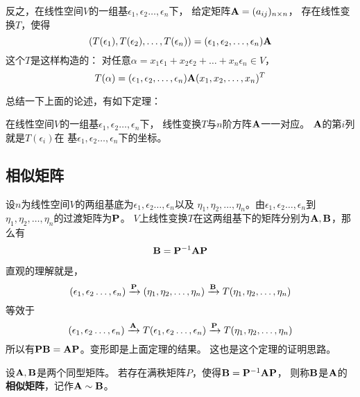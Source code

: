 反之，在线性空间$V$的一组基$\epsilon_1,\epsilon_2\dots,\epsilon_n$下，
给定矩阵$\mathbf{A}=(a_{ij})_{n\times n}$，
存在线性变换$T$，使得
\begin{displaymath}
  (T(\epsilon_1), T(\epsilon_2),\dots,T(\epsilon_n)) =
    (\epsilon_1,\epsilon_2,\dots,\epsilon_n)\mathbf{A}
\end{displaymath}
这个$T$是这样构造的：
对任意$\alpha=x_1\epsilon_1+x_2\epsilon_2+\dots+x_n\epsilon_n\in V$，
\begin{displaymath}
  T(\alpha) = (\epsilon_1,\epsilon_2,\dots,\epsilon_n)\mathbf{A}
    (x_1,x_2,\dots,x_n)^T
\end{displaymath}

总结一下上面的论述，有如下定理：
\begin{theorem}
  在线性空间$V$的一组基$\epsilon_1,\epsilon_2\dots,\epsilon_n$下，
  线性变换$T$与$n$阶方阵$\mathbf{A}$一一对应。
  $\mathbf{A}$的第$i$列就是$T(\epsilon_i)$在
  基$\epsilon_1,\epsilon_2\dots,\epsilon_n$下的坐标。
\end{theorem}

\subsection{相似矩阵}
\begin{theorem}
  设$n$为线性空间$V$的两组基底为$\epsilon_1,\epsilon_2\dots,\epsilon_n$以及
  $\eta_1,\eta_2,\dots,\eta_n$。由$\epsilon_1,\epsilon_2\dots,\epsilon_n$到
  $\eta_1,\eta_2,\dots,\eta_n$的过渡矩阵为$\mathbf{P}$。
  $V$上线性变换$T$在这两组基下的矩阵分别为$\mathbf{A},\mathbf{B}$，那么有
  \[ \mathbf{B} = \mathbf{P}^{-1}\mathbf{A}\mathbf{P} \]  
\end{theorem}

\begin{remark}
  直观的理解就是，
  \begin{displaymath}
    (\epsilon_1,\epsilon_2\dots,\epsilon_n)\xrightarrow{\mathbf{P}}
    (\eta_1,\eta_2,\dots,\eta_n)\xrightarrow{\mathbf{B}}
    T(\eta_1,\eta_2,\dots,\eta_n)
  \end{displaymath}
  等效于
  \begin{displaymath}
  (\epsilon_1,\epsilon_2\dots,\epsilon_n)\xrightarrow{\mathbf{A}}
  T(\epsilon_1,\epsilon_2\dots,\epsilon_n)\xrightarrow{\mathbf{P}}
  T(\eta_1,\eta_2,\dots,\eta_n)
  \end{displaymath}
  所以有$\mathbf{P}\mathbf{B}=\mathbf{A}\mathbf{P}$。变形即是上面定理的结果。
  这也是这个定理的证明思路。
\end{remark}

\begin{definition}[相似矩阵]
  设$\mathbf{A},\mathbf{B}$是两个同型矩阵。
  若存在满秩矩阵$P$，使得$\mathbf{B}=\mathbf{P}^{-1}\mathbf{A}\mathbf{P}$，
  则称$\mathbf{B}$是$\mathbf{A}$的\textbf{相似矩阵}，记作$\mathbf{A}\sim\mathbf{B}$。
\end{definition}

